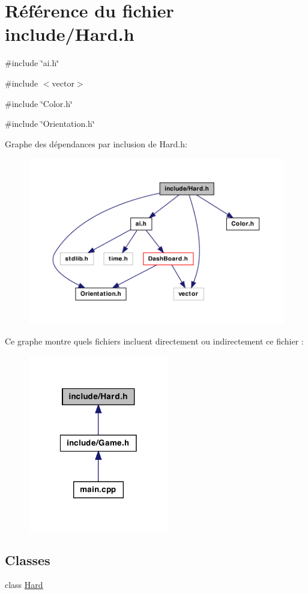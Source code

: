 \hypertarget{a00027}{
\section{Référence du fichier include/Hard.h}
\label{a00027}
}
{\ttfamily \#include \char`\"{}ai.h\char`\"{}}\par
{\ttfamily \#include $<$vector$>$}\par
{\ttfamily \#include \char`\"{}Color.h\char`\"{}}\par
{\ttfamily \#include \char`\"{}Orientation.h\char`\"{}}\par
Graphe des dépendances par inclusion de Hard.h:
\nopagebreak
\begin{figure}[H]
\begin{center}
\leavevmode
\includegraphics[width=400pt]{a00056}
\end{center}
\end{figure}
Ce graphe montre quels fichiers incluent directement ou indirectement ce fichier :
\nopagebreak
\begin{figure}[H]
\begin{center}
\leavevmode
\includegraphics[width=174pt]{a00057}
\end{center}
\end{figure}
\subsection*{Classes}
\begin{DoxyCompactItemize}
\item 
class \hyperlink{a00010}{Hard}
\end{DoxyCompactItemize}

